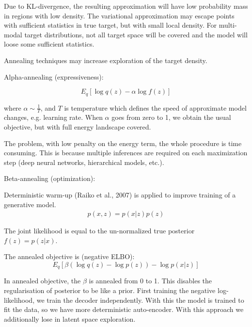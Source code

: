 \documentclass{article}
\begin{document}

Due to KL-divergence, the resulting approximation will have low probability mass in regions with low density. The variational approximation may escape points with sufficient statistics in true target, but with small local density. For multi-modal target distributions, not all target space will be covered and the model will loose some sufficient statistics.

Annealing techniques may increase exploration of the target density.

Alpha-annealing (expressiveness):

\begin{equation*}
    E_q[\log q(z) - \alpha \log f(z)]
\end{equation*}

where $\alpha \sim \frac{1}{T}$, and $T$ is temperature which defines the speed of approximate model changes, e.g. learning rate. 
When $\alpha$ goes from zero to 1, we obtain the usual objective, but with full energy landscape covered. 

The problem, with low penalty on the energy term, the whole procedure is time consuming. This is because multiple inferences are required on each maximization step (deep neural networks, hierarchical models, etc.).

Beta-annealing (optimization): 

Deterministic warm-up (Raiko et al., 2007) is applied to improve training of a generative model. 
\begin{align*}
    p(x, z) = p(x|z)p(z)
\end{align*}

The joint likelihood is equal to the un-normalized true posterior $f(z) = p(z | x)$.

The annealed objective is (negative ELBO):
\begin{equation*}
    E_q[\beta (\log q(z) - \log p(z)) - \log p(x|z)]
\end{equation*}

In annealed objective, the $\beta$ is annealed from 0 to 1. This disables the regularisation of posterior to be like a prior. First  training the negative log-likelihood, we train the decoder independently. With this the model is trained to fit the data, so we have more deterministic auto-encoder. With this approach we additionally lose in latent space exploration.
\end{document}
